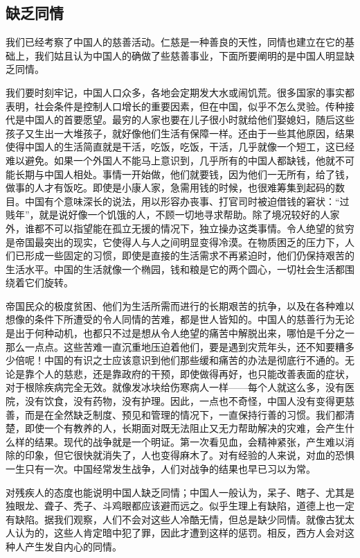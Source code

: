 \documentclass[12pt,oneside]{book}
\begin{document}
\begin{common-format}
\chapter{缺乏同情}
我们已经考察了中国人的慈善活动。仁慈是一种善良的天性，同情也建立在它的基础上，我们姑且认为中国人的确做了些慈善事业，下面所要阐明的是中国人明显缺乏同情。 

我们要时刻牢记，中国人口众多，各地会定期发大水或闹饥荒。很多国家的事实都表明，社会条件是控制人口增长的重要因素，但在中国，似乎不怎么灵验。传种接代是中国人的首要愿望。最穷的人家也要在儿子很小时就给他们娶媳妇，随后这些孩子又生出一大堆孩子，就好像他们生活有保障一样。还由于一些其他原因，结果使得中国人的生活简直就是干活，吃饭，吃饭，干活，几乎就像一个短工，这已经难以避免。如果一个外国人不能马上意识到，几乎所有的中国人都缺钱，他就不可能长期与中国人相处。事情一开始做，他们就要钱，因为他们一无所有，给了钱，做事的人才有饭吃。即使是小康人家，急需用钱的时候，也很难筹集到起码的数目。中国有个意味深长的说法，用以形容办丧事、打官司时被迫借钱的窘状：“过贱年”，就是说好像一个饥饿的人，不顾一切地寻求帮助。除了境况较好的人家外，谁都不可以指望能在孤立无援的情况下，独立操办这类事情。令人绝望的贫穷是帝国最突出的现实，它使得人与人之间明显变得冷漠。在物质困乏的压力下，人们已形成一些固定的习惯，即使是直接的生活需求不再紧迫时，他们仍保持艰苦的生活水平。中国的生活就像一个椭园，钱和粮是它的两个圆心，一切社会生活都围绕着它们旋转。 

帝国民众的极度贫困、他们为生活所需而进行的长期艰苦的抗争，以及在各种难以想像的条件下所遭受的令人同情的苦难，都是世人皆知的。中国人的慈善行为无论是出于何种动机，也都只不过是想从令人绝望的痛苦中解脱出来，哪怕是千分之一那么一点点。这些苦难一直沉重地压迫着他们，要是遇到灾荒年头，还不知要糟多少倍呢！中国的有识之士应该意识到他们那些缓和痛苦的办法是彻底行不通的。无论是靠个人的慈悲，还是靠政府的干预，即使做得再好，也只能改善表面的症状，对于根除疾病完全无效。就像发冰块给伤寒病人一样——每个人就这么多，没有医院，没有饮食，没有药物，没有护理。因此，一点也不奇怪，中国人没有变得更慈善，而是在全然缺乏制度、预见和管理的情况下，一直保持行善的习惯。我们都清楚，即使一个有教养的人，长期面对既无法阻止又无力帮助解决的灾难，会产生什么样的结果。现代的战争就是一个明证。第一次看见血，会精神紧张，产生难以消除的印象，但它很快就消失了，人也变得麻木了。对有经验的人来说，对血的恐惧一生只有一次。中国经常发生战争，人们对战争的结果也早已习以为常。 

对残疾人的态度也能说明中国人缺乏同情；中国人一般认为，呆子、瞎子、尤其是独眼龙、聋子、秃子、斗鸡眼都应该避而远之。似乎生理上有缺陷，道德上也一定有缺陷。据我们观察，人们不会对这些人冷酷无情，但总是缺少同情。就像古犹太人认为的，这些人肯定暗中犯了罪，因此才遭到这样的惩罚。相反，西方人会对这种人产生发自内心的同情。 


\end{common-format}
\end{document}
